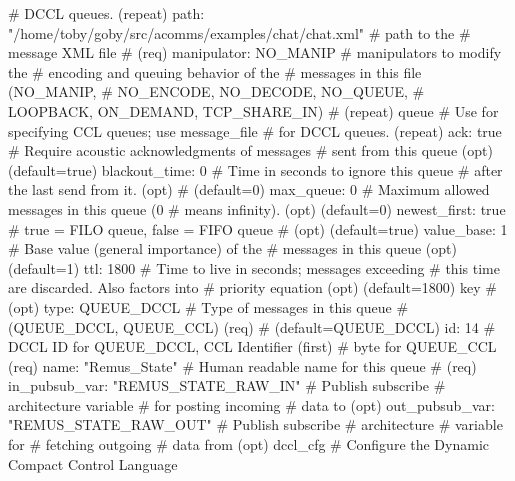 \documentclass[11pt, letterpaper, oneside]{memoir}
\begin{document}
\begin{boxedverbatim}
{{{                    # DCCL queues. (repeat)
      path: "/home/toby/goby/src/acomms/examples/chat/chat.xml"  
                                              # path to the 
                                              # message XML file 
                                              # (req)
      manipulator: NO_MANIP  # manipulators to modify the 
                             # encoding and queuing behavior of the 
                             # messages in this file (NO_MANIP, 
                             # NO_ENCODE, NO_DECODE, NO_QUEUE, 
                             # LOOPBACK, ON_DEMAND, TCP_SHARE_IN) 
                             # (repeat)
    }
    queue {  # Use for specifying CCL queues; use message_file 
             # for DCCL queues. (repeat)
      ack: true  # Require acoustic acknowledgments of messages 
                 # sent from this queue (opt) (default=true)
      blackout_time: 0  # Time in seconds to ignore this queue 
                        # after the last send from it. (opt) 
                        # (default=0)
      max_queue: 0  # Maximum allowed messages in this queue (0 
                    # means infinity). (opt) (default=0)
      newest_first: true  # true = FILO queue, false = FIFO queue 
                          # (opt) (default=true)
      value_base: 1  # Base value (general importance) of the 
                     # messages in this queue (opt) (default=1)
      ttl: 1800  # Time to live in seconds; messages exceeding 
                 # this time are discarded. Also factors into 
                 # priority equation (opt) (default=1800)
      key {  #  (opt)
        type: QUEUE_DCCL  # Type of messages in this queue 
                          # (QUEUE_DCCL, QUEUE_CCL) (req) 
                          # (default=QUEUE_DCCL)
        id: 14  # DCCL ID for QUEUE_DCCL, CCL Identifier (first) 
                # byte for QUEUE_CCL (req)
      }
      name: "Remus_State"  # Human readable name for this queue 
                           # (req)
      in_pubsub_var: "REMUS_STATE_RAW_IN"  # Publish subscribe 
                                           # architecture variable 
                                           # for posting incoming 
                                           # data to (opt)
      out_pubsub_var: "REMUS_STATE_RAW_OUT"  # Publish subscribe 
                                             # architecture 
                                             # variable for 
                                             # fetching outgoing 
                                             # data from (opt)
    }
  }
  dccl_cfg {  # Configure the Dynamic Compact Control Language 
}}
\end{boxedverbatim}
\end{document}
